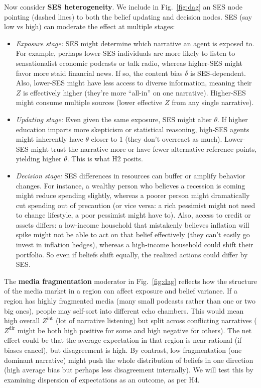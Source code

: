 \documentclass[12pt]{article}
\begin{document}
Now consider \textbf{SES heterogeneity}. We include in Fig.~\ref{fig:dag} an SES node pointing (dashed lines) to both the belief updating and decision nodes. SES (say low vs high) can moderate the effect at multiple stages: \begin{itemize} \item \emph{Exposure stage:} SES might determine which narrative an agent is exposed to. For example, perhaps lower-SES individuals are more likely to listen to sensationalist economic podcasts or talk radio, whereas higher-SES might favor more staid financial news. If so, the content bias $\delta$ is SES-dependent. Also, lower-SES might have less access to diverse information, meaning their $Z$ is effectively higher (they're more ``all-in'' on one narrative). Higher-SES might consume multiple sources (lower effective $Z$ from any single narrative). \item \emph{Updating stage:} Even given the same exposure, SES might alter $\theta$. If higher education imparts more skepticism or statistical reasoning, high-SES agents might inherently have $\theta$ closer to 1 (they don't overreact as much). Lower-SES might trust the narrative more or have fewer alternative reference points, yielding higher $\theta$. This is what H2 posits. \item \emph{Decision stage:} SES differences in resources can buffer or amplify behavior changes. For instance, a wealthy person who believes a recession is coming might reduce spending slightly, whereas a poorer person might dramatically cut spending out of precaution (or vice versa: a rich pessimist might not need to change lifestyle, a poor pessimist might have to). Also, access to credit or assets differs: a low-income household that mistakenly believes inflation will spike might not be able to act on that belief effectively (they can't easily go invest in inflation hedges), whereas a high-income household could shift their portfolio. So even if beliefs shift equally, the realized actions could differ by SES. \end{itemize}
The \textbf{media fragmentation} moderator in Fig.~\ref{fig:dag} reflects how the structure of the media market in a region can affect exposure and belief variance. If a region has highly fragmented media (many small podcasts rather than one or two big ones), people may self-sort into different echo chambers. This would mean high overall $Z^{\text{int}}$ (lot of narrative listening) but split across conflicting narratives ($Z^{\text{dir}}$ might be both high positive for some and high negative for others). The net effect could be that the average expectation in that region is near rational (if biases cancel), but disagreement is high. By contrast, low fragmentation (one dominant narrative) might push the whole distribution of beliefs in one direction (high average bias but perhaps less disagreement internally). We will test this by examining dispersion of expectations as an outcome, as per H4.
\end{document}
